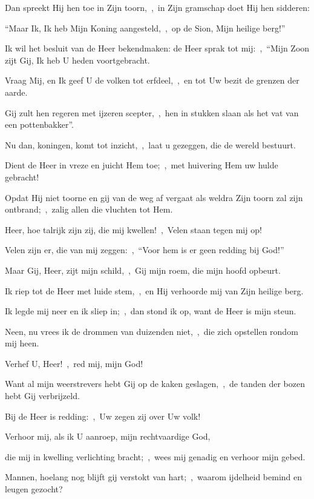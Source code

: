 \documentclass[12pt,twoside,a5paper]{article}
\begin{document}
\begin{halfparskip}
  Dan spreekt Hij hen toe in Zijn toorn,~\sep\ in Zijn gramschap doet Hij hen sidderen:

  ``Maar Ik, Ik heb Mijn Koning aangesteld,~\sep\ op de Sion, Mijn heilige berg!''

  Ik wil het besluit van de Heer bekendmaken: de Heer sprak tot mij:~\sep\ ``Mijn Zoon zijt Gij, Ik heb U heden voortgebracht.

  Vraag Mij, en Ik geef U de volken tot erfdeel,~\sep\ en tot Uw bezit de grenzen der aarde.

  Gij zult hen regeren met ijzeren scepter,~\sep\ hen in stukken slaan als het vat van een pottenbakker''.

  Nu dan, koningen, komt tot inzicht,~\sep\ laat u gezeggen, die de wereld bestuurt.

  Dient de Heer in vreze en juicht Hem toe;~\sep\ met huivering Hem uw hulde gebracht!

  Opdat Hij niet toorne en gij van de weg af vergaat als weldra Zijn toorn zal zijn ontbrand;~\sep\ zalig allen die vluchten tot Hem.

   Heer, hoe talrijk zijn zij, die mij kwellen!~\sep\ Velen staan tegen mij op!

  Velen zijn er, die van mij zeggen:~\sep\ ``Voor hem is er geen redding bij God!''

  Maar Gij, Heer, zijt mijn schild,~\sep\ Gij mijn roem, die mijn hoofd opbeurt.

  Ik riep tot de Heer met luide stem,~\sep\ en Hij verhoorde mij van Zijn heilige berg.

  Ik legde mij neer en ik sliep in;~\sep\ dan stond ik op, want de Heer is mijn steun.

  Neen, nu vrees ik de drommen van duizenden niet,~\sep\ die zich opstellen rondom mij heen.

  Verhef U, Heer!~\sep\ red mij, mijn God!

  Want al mijn weerstrevers hebt Gij op de kaken geslagen,~\sep\ de tanden der bozen hebt Gij verbrijzeld.

  Bij de Heer is redding:~\sep\ Uw zegen zij over Uw volk!

   Verhoor mij, als ik U aanroep, mijn rechtvaardige God,

  die mij in kwelling verlichting bracht;~\sep\ wees mij genadig en verhoor mijn gebed.

  Mannen, hoelang nog blijft gij verstokt van hart;~\sep\ waarom ijdelheid bemind en leugen gezocht?


\end{halfparskip}
\end{document}
